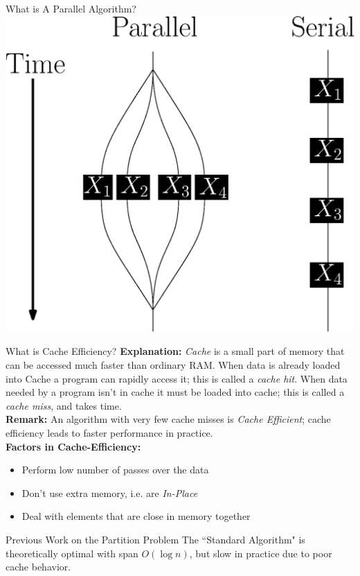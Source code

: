 \documentclass[table,serif,mathserif,final]{beamer}
\theoremstyle{remark}
\begin{document}
\begin{frame}{}
\begin{columns}[t]
\begin{column}{0.43\linewidth}
\begin{block}{\Huge What is A Parallel Algorithm?}
  \centering
  \includegraphics[width=0.6\linewidth]{imgs/parallelForLoop/serialParallelComparison.eps}
\end{block}
\begin{block}{\Huge What is Cache Efficiency?}
  \justifying
  \Huge
  \textbf{Explanation:} \emph{Cache} is a small part of memory that can be accessed much faster than ordinary RAM. When data is already loaded into Cache a program can rapidly access it; this is called a \emph{cache hit}. When data needed by a program isn't in cache it must be loaded into cache; this is called a \emph{cache miss}, and takes time. \\
  \textbf{Remark:} An algorithm with very few cache misses is \emph{Cache Efficient}; cache efficiency leads to faster performance in practice.\\
  \textbf{Factors in Cache-Efficiency:}
  \begin{itemize}
    \item Perform low number of passes over the data
    \item Don't use extra memory, i.e. are \emph{In-Place}
    \item Deal with elements that are close in memory together
  \end{itemize}
\end{block}

\begin{block}{\Huge Previous Work on the Partition Problem}
  \justifying
  \Huge
  The ``Standard Algorithm" is {\color{blue} theoretically optimal with span $O(\log n)$,} {\color{red} but slow in practice due to poor cache behavior.}


\end{block}
\end{column}
\end{columns}
\end{frame}
\end{document}
